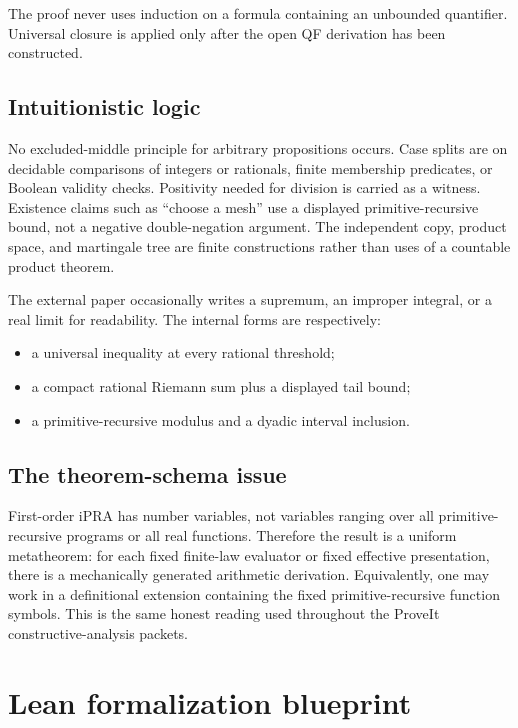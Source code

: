 \documentclass[11pt]{article}
\newcommand{\ipra}{\mathrm{iPRA}}
\begin{document}
The proof never uses induction on a formula containing an unbounded
quantifier.  Universal closure is applied only after the open QF derivation
has been constructed.

\subsection{Intuitionistic logic}

No excluded-middle principle for arbitrary propositions occurs.  Case splits
are on decidable comparisons of integers or rationals, finite membership
predicates, or Boolean validity checks.  Positivity needed for division is
carried as a witness.  Existence claims such as ``choose a mesh'' use a
displayed primitive-recursive bound, not a negative double-negation
argument.  The independent copy, product space, and martingale tree are
finite constructions rather than uses of a countable product theorem.

The external paper occasionally writes a supremum, an improper integral, or
a real limit for readability.  The internal forms are respectively:

\begin{itemize}
\item a universal inequality at every rational threshold;
\item a compact rational Riemann sum plus a displayed tail bound;
\item a primitive-recursive modulus and a dyadic interval inclusion.
\end{itemize}

\subsection{The theorem-schema issue}

First-order \(\ipra\) has number variables, not variables ranging over all
primitive-recursive programs or all real functions.  Therefore the result is
a uniform metatheorem: for each fixed finite-law evaluator or fixed effective
presentation, there is a mechanically generated arithmetic derivation.
Equivalently, one may work in a definitional extension containing the fixed
primitive-recursive function symbols.  This is the same honest reading used
throughout the ProveIt constructive-analysis packets.

\section{Lean formalization blueprint}
\label{sec:lean}
\end{document}
